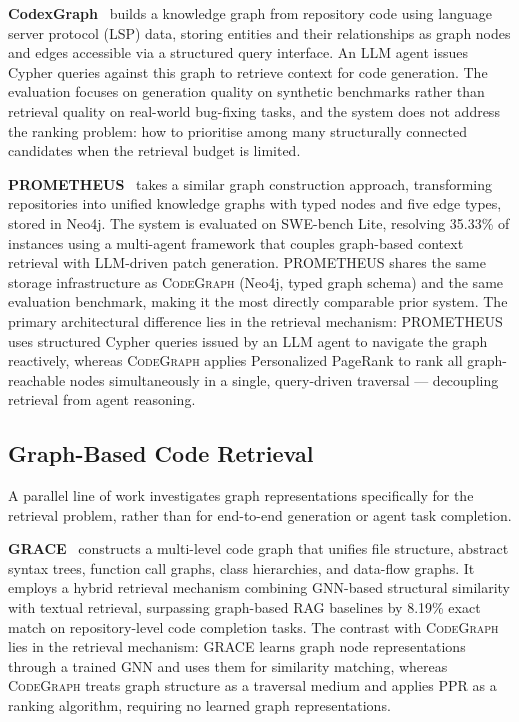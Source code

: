 \textbf{CodexGraph}~\cite{liu2024codexgraph} builds a knowledge graph from repository
code using language server protocol (LSP) data, storing entities and their relationships
as graph nodes and edges accessible via a structured query interface.
An LLM agent issues Cypher queries against this graph to retrieve context for code
generation.
The evaluation focuses on generation quality on synthetic benchmarks rather than
retrieval quality on real-world bug-fixing tasks, and the system does not address the
ranking problem: how to prioritise among many structurally connected candidates when the
retrieval budget is limited.

\textbf{PROMETHEUS}~\cite{prometheus2024} takes a similar graph construction approach,
transforming repositories into unified knowledge graphs with typed nodes and five edge
types, stored in \mbox{Neo4j}.
The system is evaluated on SWE-bench Lite, resolving 35.33\% of instances using a
multi-agent framework that couples graph-based context retrieval with LLM-driven patch
generation.
PROMETHEUS shares the same storage infrastructure as \textsc{CodeGraph} (Neo4j, typed
graph schema) and the same evaluation benchmark, making it the most directly comparable
prior system.
The primary architectural difference lies in the retrieval mechanism: PROMETHEUS uses
structured Cypher queries issued by an LLM agent to navigate the graph reactively,
whereas \textsc{CodeGraph} applies Personalized PageRank to rank all graph-reachable
nodes simultaneously in a single, query-driven traversal — decoupling retrieval from
agent reasoning.

\subsection{Graph-Based Code Retrieval}
\label{sec:graph-retrieval-related}

A parallel line of work investigates graph representations specifically for the retrieval
problem, rather than for end-to-end generation or agent task completion.

\textbf{GRACE}~\cite{grace2026} constructs a multi-level code graph that unifies file
structure, abstract syntax trees, function call graphs, class hierarchies, and data-flow
graphs.
It employs a hybrid retrieval mechanism combining GNN-based structural similarity with
textual retrieval, surpassing graph-based RAG baselines by 8.19\% exact match on
repository-level code completion tasks.
The contrast with \textsc{CodeGraph} lies in the retrieval mechanism: GRACE learns
graph node representations through a trained GNN and uses them for similarity matching,
whereas \textsc{CodeGraph} treats graph structure as a traversal medium and applies PPR
as a ranking algorithm, requiring no learned graph representations.

